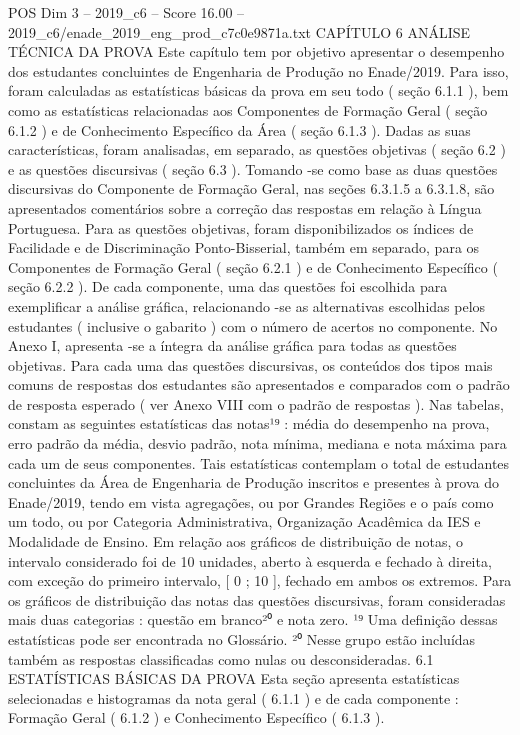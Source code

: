 \begin{textsample}{POS Dim 3 – 2019\_c6 – Score 16.00 – 2019\_c6/enade\_2019\_eng\_prod\_c7c0e9871a.txt}  \label{ex:f3_pos_015}
CAPÍTULO 6 ANÁLISE TÉCNICA DA PROVA Este capítulo tem por objetivo apresentar o desempenho dos estudantes concluintes de Engenharia de Produção no Enade/2019.
Para isso, foram calculadas as estatísticas básicas da prova em seu todo ( seção 6.1.1 ), bem como as estatísticas relacionadas aos Componentes de Formação Geral ( seção 6.1.2 ) e de Conhecimento Específico da Área ( seção 6.1.3 ).
Dadas as suas características, foram analisadas, em separado, as questões objetivas ( seção 6.2 ) e as questões discursivas ( seção 6.3 ).
Tomando -se como base as duas questões discursivas do Componente de Formação Geral, nas seções 6.3.1.5 a 6.3.1.8, são apresentados comentários sobre a correção das respostas em relação à Língua Portuguesa.
Para as questões objetivas, foram disponibilizados os índices de Facilidade e de Discriminação Ponto-Bisserial, também em separado, para os Componentes de Formação Geral ( seção 6.2.1 ) e de Conhecimento Específico ( seção 6.2.2 ).
De cada componente, uma das questões foi escolhida para exemplificar a análise gráfica, relacionando -se as alternativas escolhidas pelos estudantes ( inclusive o gabarito ) com o número de acertos no componente.
No Anexo I, apresenta -se a íntegra da análise gráfica para todas as questões objetivas.
Para cada uma das questões discursivas, os conteúdos dos tipos mais comuns de respostas dos estudantes são apresentados e comparados com o padrão de resposta esperado ( ver Anexo VIII com o padrão de respostas ).
Nas tabelas, constam as seguintes estatísticas das notas¹⁹ : média do desempenho na prova, erro padrão da média, desvio padrão, nota mínima, mediana e nota máxima para cada um de seus componentes.
Tais estatísticas contemplam o total de estudantes concluintes da Área de Engenharia de Produção inscritos e presentes à prova do Enade/2019, tendo em vista agregações, ou por Grandes Regiões e o país como um todo, ou por Categoria Administrativa, Organização Acadêmica da IES e Modalidade de Ensino.
Em relação aos gráficos de distribuição de notas, o intervalo considerado foi de 10 unidades, aberto à esquerda e fechado à direita, com exceção do primeiro intervalo, [ 0 ; 10 ], fechado em ambos os extremos.
Para os gráficos de distribuição das notas das questões discursivas, foram consideradas mais duas categorias : questão em branco²⁰ e nota zero. ¹⁹ Uma definição dessas estatísticas pode ser encontrada no Glossário. ²⁰ Nesse grupo estão incluídas também as respostas classificadas como nulas ou desconsideradas. 6.1 ESTATÍSTICAS BÁSICAS DA PROVA Esta seção apresenta estatísticas selecionadas e histogramas da nota geral ( 6.1.1 ) e de cada componente : Formação Geral ( 6.1.2 ) e Conhecimento Específico ( 6.1.3 ).

\end{textsample}
